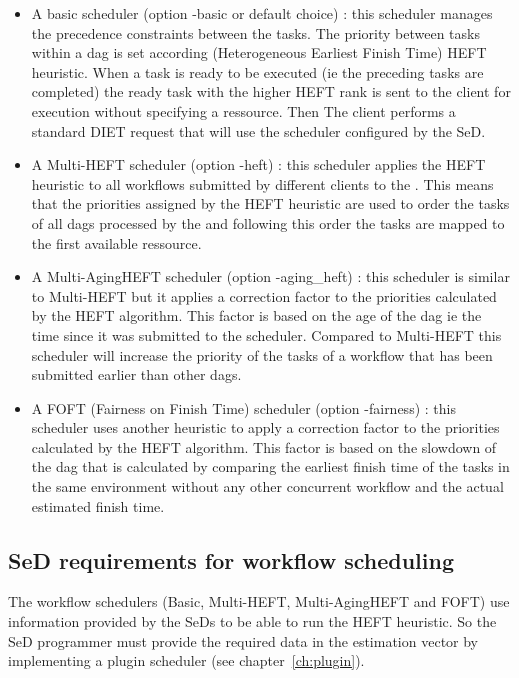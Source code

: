 \begin{itemize}

\item A basic scheduler (option -basic or default choice) :
this scheduler manages the precedence constraints between the tasks. The
 priority between tasks within a dag is set according (Heterogeneous
Earliest Finish Time) HEFT~\cite{heft_cpop} heuristic. When a task is ready to be
executed (ie the preceding tasks are completed) the ready task with the higher
HEFT rank is sent to the client for execution without specifying a ressource.
Then The client performs a standard DIET request that will use the scheduler
configured by the SeD.

\item A Multi-HEFT scheduler (option -heft) : this scheduler applies
the HEFT heuristic to all workflows submitted by different clients to
the \madag. This means that the priorities assigned by the HEFT
heuristic are used to order the tasks of all dags processed by the
\madag and following this order the tasks are mapped to the first
available ressource.

\item A Multi-AgingHEFT scheduler (option -aging\_heft) : this scheduler
is similar to Multi-HEFT but it applies a correction factor to the
priorities calculated by the HEFT algorithm. This factor is based on
the age of the dag ie the time since it was submitted to the scheduler.
Compared to Multi-HEFT this scheduler will increase the priority of the
tasks of a workflow that has been submitted earlier than other dags.

\item A FOFT (Fairness on Finish Time) scheduler (option -fairness) :
this scheduler uses another heuristic to apply a correction factor to
the priorities calculated by the HEFT algorithm. This factor is based
on the slowdown of the dag that is calculated by comparing the earliest
finish time of the tasks in the same environment without any other
concurrent workflow and the actual estimated finish time.

\end{itemize}

\subsection{SeD requirements for workflow scheduling}

The workflow schedulers (Basic, Multi-HEFT, Multi-AgingHEFT and FOFT) use
information provided by the SeDs to be able to run the HEFT heuristic. So the
SeD programmer must provide the required data in the estimation vector by
implementing a plugin scheduler (see chapter~\ref{ch:plugin}).

